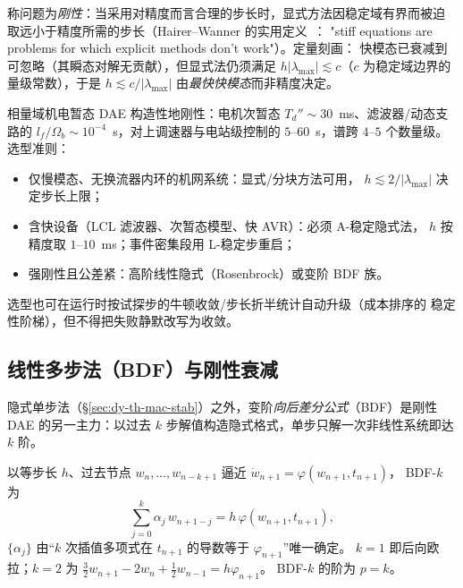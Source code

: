 \begin{definition}[刚性（stiffness）]\label{def:dy-th-mac-stiff}
称问题为\emph{刚性}：当采用对精度而言合理的步长时，显式方法因稳定域有界而被迫
取远小于精度所需的步长（Hairer--Wanner 的实用定义~\cite{dym:hairer2}：
"stiff equations are problems for which explicit methods don't work"）。定量刻画：
快模态已衰减到可忽略（其瞬态对解无贡献），但显式法仍须满足
$h|\lambda_{\max}|\lesssim c$（$c$ 为稳定域边界的量级常数），于是
$h\lesssim c/|\lambda_{\max}|$ 由\emph{最快快模态}而非精度决定。
\end{definition}

\begin{remark}[机电暂态的刚性谱与选型准则]\label{rem:dy-th-mac-choose}
相量域机电暂态 DAE 构造性地刚性：电机次暂态 $T_d''\sim30$~ms、滤波器/动态支路的
$l_f/\Omega_b\sim10^{-4}$~s，对上调速器与电站级控制的 $5$--$60$~s，谱跨
$4$--$5$ 个数量级。选型准则：
\begin{itemize}
  \item 仅慢模态、无换流器内环的机网系统：显式/分块方法可用，
        $h\lesssim2/|\lambda_{\max}|$ 决定步长上限；
  \item 含快设备（LCL 滤波器、次暂态模型、快 AVR）：必须 A-稳定隐式法，
        $h$ 按精度取 $1$--$10$~ms；事件密集段用 L-稳定步重启；
  \item 强刚性且公差紧：高阶线性隐式（Rosenbrock）或变阶 BDF 族。
\end{itemize}
选型也可在运行时按试探步的牛顿收敛/步长折半统计自动升级（成本排序的
稳定性阶梯），但不得把失败静默改写为收敛。
\end{remark}

\subsection{线性多步法（BDF）与刚性衰减}\label{sec:dy-th-mac-bdf}

隐式单步法（§\ref{sec:dy-th-mac-stab}）之外，变阶\emph{向后差分公式}（BDF）是刚性 DAE
的另一主力：以过去 $k$ 步解值构造隐式格式，单步只解一次非线性系统即达 $k$ 阶。

\begin{definition}[BDF-$k$ 公式]\label{def:dy-th-mac-bdf}
以等步长 $h$、过去节点 $w_{n},\dots,w_{n-k+1}$ 逼近 $\dot w_{n+1}=\varphi(w_{n+1},t_{n+1})$，
BDF-$k$ 为
\begin{equation}
\sum_{j=0}^{k}\alpha_j\,w_{n+1-j}=h\,\varphi(w_{n+1},t_{n+1}),
\label{eq:dy-th-mac-bdf}
\end{equation}
$\{\alpha_j\}$ 由“$k$ 次插值多项式在 $t_{n+1}$ 的导数等于 $\varphi_{n+1}$”唯一确定。
$k{=}1$ 即后向欧拉；$k{=}2$ 为 $\tfrac32 w_{n+1}-2w_n+\tfrac12 w_{n-1}=h\varphi_{n+1}$。
BDF-$k$ 的阶为 $p=k$。
\end{definition}

